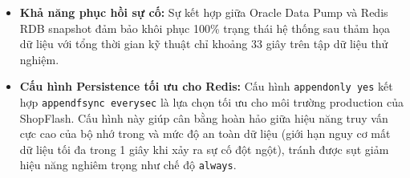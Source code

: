 \begin{itemize}[label=--]
    \item \textbf{Khả năng phục hồi sự cố:} Sự kết hợp giữa Oracle Data Pump và Redis RDB snapshot đảm bảo khôi phục 100\% trạng thái hệ thống sau thảm họa dữ liệu với tổng thời gian kỹ thuật chỉ khoảng 33 giây trên tập dữ liệu thử nghiệm.
    \item \textbf{Cấu hình Persistence tối ưu cho Redis:} Cấu hình \texttt{appendonly yes} kết hợp \texttt{appendfsync everysec} là lựa chọn tối ưu cho môi trường production của ShopFlash. Cấu hình này giúp cân bằng hoàn hảo giữa hiệu năng truy vấn cực cao của bộ nhớ trong và mức độ an toàn dữ liệu (giới hạn nguy cơ mất dữ liệu tối đa trong 1 giây khi xảy ra sự cố đột ngột), tránh được sụt giảm hiệu năng nghiêm trọng như chế độ \texttt{always}.
\end{itemize}
\endgroup
